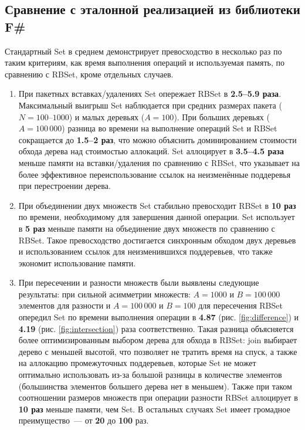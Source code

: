 \documentclass[a4paper]{article}
\begin{document}
\subsection{Сравнение с эталонной реализацией из библиотеки F\#}
Стандартный Set в среднем демонстрирует превосходство в несколько раз по таким критериям, как время выполнения операций и используемая память, 
по сравнению с RBSet, кроме отдельных случаев.
\begin{enumerate}
    \item При пакетных вставках/удалениях Set опережает RBSet в \textbf{2.5--5.9 раза}.
          Максимальный выигрыш Set наблюдается при средних размерах
          пакета ($N = 100$--$1000$) и малых деревьях ($A = 100$).
          При больших деревьях ($A = 100\,000$) разница во времени на выполнение 
          операций Set и RBSet сокращается до \textbf{1.5--2 раз}, что можно объяснить 
          доминированием стоимости обхода дерева над стоимостью аллокаций.
          Set аллоцирует в \textbf{3.5--4.5 раза}
          меньше памяти на вставки/удаления по сравнению с RBSet, 
          что указывает на более эффективное переиспользование ссылок на неизменённые поддеревья при перестроении дерева.
    \item При объединении двух множеств Set стабильно превосходит RBSet в \textbf{10 раз} по времени, необходимому для 
          завершения данной операции.
          Set использует в \textbf{5 раз} меньше памяти на объединение двух множеств по сравнению с RBSet.
          Такое превосходство достигается синхронным обходом двух деревьев и использованием ссылок для неизменившихся поддеревьев, 
          что также экономит использование памяти.
    \item При пересечении и разности множеств были выявлены следующие результаты: 
          при сильной асимметрии множеств: $A = 1000$ и $B = 100\,000$ элементов для разности и 
           $A = 100\,000$ и $B = 100$ для пересечения RBSet опередил Set по времени выполнения операции в \textbf{4.87} (рис. \ref{fig:difference}) и \textbf{4.19} (рис. \ref{fig:intersection}) раза соответственно.
           Такая разница объясняется более оптимизированным выбором дерева для обхода в RBSet: join выбирает дерево с меньшей высотой, что позволяет не тратить 
           время на спуск, а также на аллокацию промежуточных поддеревьев, которые Set не может оптимально использовать из-за большой разницы в количестве 
           элементов (большинства элементов большего дерева нет в меньшем). Также при таком соотношении размеров множеств при операции разности RBSet аллоцирует 
           в \textbf{10 раз} меньше памяти, чем Set. В остальных случаях Set имеет громадное преимущество~--- от \textbf{20} до \textbf{100} раз.
\end{enumerate}  
\end{document}
